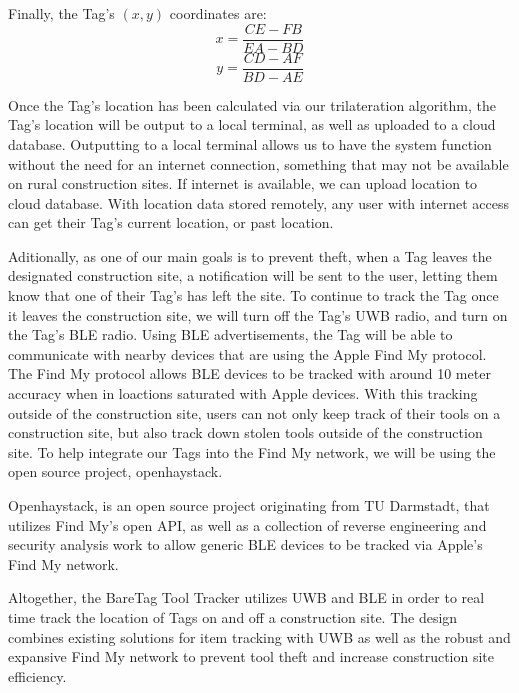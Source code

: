 \documentclass[conference]{IEEEtran}
\begin{document}
Finally, the Tag's $(x,y)$ coordinates are:
\[x = \frac{CE - FB}{EA - BD}\]
\[y = \frac{CD - AF}{BD - AE}\]

Once the Tag's location has been calculated via our trilateration algorithm,
the Tag's location will be output to a local terminal, as well as 
uploaded to a cloud database. Outputting to a local terminal allows us to
have the system function without the need for an internet connection, 
something that may not be available on rural construction sites. If internet
is available, we can upload location to cloud database. With location data
stored remotely, any user with internet access can get their Tag's current
location, or past location.

Aditionally, as one of our main goals is to prevent theft, when a Tag
leaves the designated construction site, a notification will be sent to 
the user, letting them know that one of their Tag's has left the site.
To continue to track the Tag once it leaves the construction site, we will
turn off the Tag's UWB radio, and turn on the Tag's BLE radio. Using BLE
advertisements, the Tag will be able to communicate with nearby devices that
are using the Apple Find My protocol. The Find My protocol allows BLE devices
to be tracked with around 10 meter accuracy when in loactions saturated with 
Apple devices. With this tracking outside of the construction site, users 
can not only keep track of their tools on a construction site, but also track
down stolen tools outside of the construction site. To help integrate our
Tags into the Find My network, we will be using the open source project,
openhaystack. 

Openhaystack, is an open source project originating from TU Darmstadt, that
utilizes Find My's open API, as well as a collection of reverse engineering
and security analysis work to allow generic BLE devices to be tracked via
Apple's Find My network.

Altogether, the BareTag Tool Tracker utilizes UWB and BLE in order to real
time track the location of Tags on and off a construction site. The design
combines existing solutions for item tracking with UWB as well as the robust
and expansive Find My network to prevent tool theft and increase construction
site efficiency.  
\end{document}
